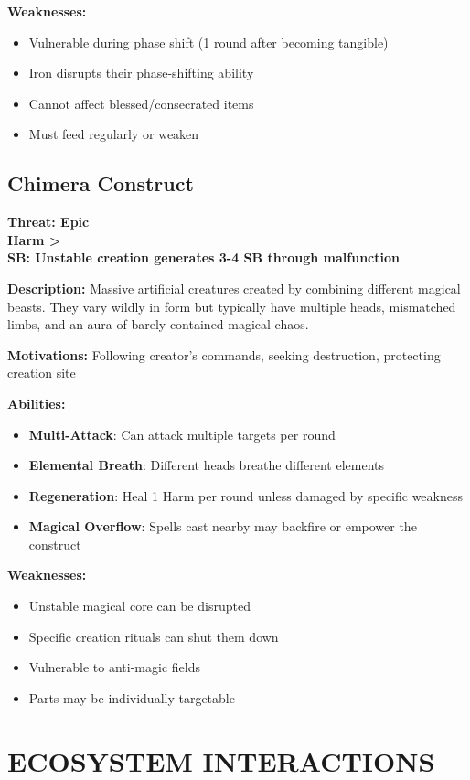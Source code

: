 \documentclass[12pt]{article}
\newcommand{\cp}[1]{\textbf{SB: #1}}
\newcommand{\harm}[1]{\textbf{Harm #1}}
\newcommand{\threat}[1]{\textbf{Threat: #1}}
\begin{document}
\begin{itemize}
\textbf{Weaknesses:}
\begin{itemize}
\item Vulnerable during phase shift (1 round after becoming tangible)
\item Iron disrupts their phase-shifting ability
\item Cannot affect blessed/consecrated items
\item Must feed regularly or weaken
\end{itemize}

\subsection*{Chimera Construct}

\threat{Epic} \\
\harm{>} \\
\cp{Unstable creation generates 3-4 SB through malfunction}

\vspace{0.5em}
\textbf{Description:} Massive artificial creatures created by combining different magical beasts. They vary wildly in form but typically have multiple heads, mismatched limbs, and an aura of barely contained magical chaos.

\textbf{Motivations:} Following creator's commands, seeking destruction, protecting creation site

\textbf{Abilities:}
\begin{itemize}
\item \textbf{Multi-Attack}: Can attack multiple targets per round
\item \textbf{Elemental Breath}: Different heads breathe different elements
\item \textbf{Regeneration}: Heal 1 Harm per round unless damaged by specific weakness
\item \textbf{Magical Overflow}: Spells cast nearby may backfire or empower the construct
\end{itemize}

\textbf{Weaknesses:}
\begin{itemize}
\item Unstable magical core can be disrupted
\item Specific creation rituals can shut them down
\item Vulnerable to anti-magic fields
\item Parts may be individually targetable
\end{itemize}

\section{ECOSYSTEM INTERACTIONS}


\end{itemize}
\end{document}
